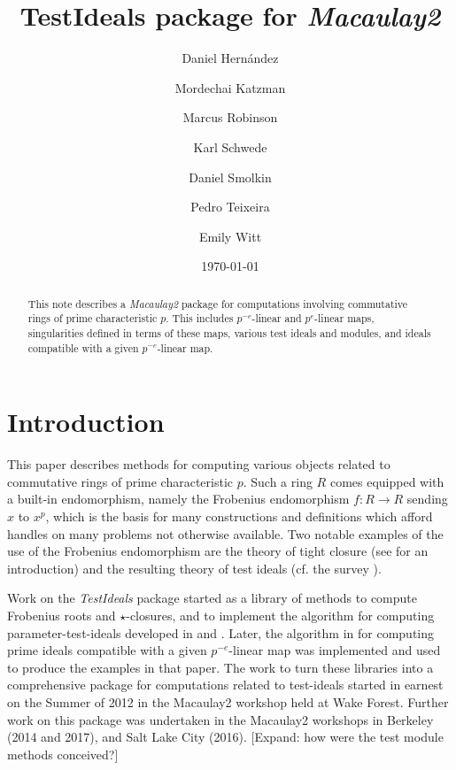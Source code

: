 \documentclass[11pt]{amsart}
\begin{document}
\title{{TestIdeals} package for \emph{Macaulay2}}
\author{Daniel Hern\'andez}
\author{Mordechai Katzman}
\author{Marcus Robinson}
\author{Karl Schwede}
\author{Daniel Smolkin}
\author{Pedro Teixeira}
\author{Emily Witt}
\date{\today}
\address{Department of Mathematics, University of Utah, 155 S 1400 E Room 233, Salt Lake City, UT, 84112}

\begin{abstract}
  This note describes a \emph{Macaulay2} package for computations involving commutative rings of prime characteristic $p$.   
  This includes $p^{-e}$-linear and $p^{e}$-linear  maps,
  singularities defined in terms of these maps,  various test ideals and modules, and ideals compatible with a given $p^{-e}$-linear map.
\end{abstract}




\maketitle

\section{Introduction}

This paper describes methods for computing various objects related to commutative rings of prime characteristic $p$.
Such a ring $R$ comes equipped with a built-in endomorphism, namely the Frobenius endomorphism $f:R \rightarrow R$ sending $x$ to $x^p$, which is the basis for many constructions and definitions
which afford handles on many problems not otherwise available. Two notable examples of the use of the Frobenius endomorphism are the theory of tight closure 
(see \cite{HochsterHunekeTC1} for an introduction)
and the resulting theory of test ideals
(cf. the survey \cite{SchwedeTuckerTestIdealSurvey}).

Work on the \emph{TestIdeals} package started as a library of methods to compute  Frobenius roots  and $\star$-closures, and to implement the algorithm for computing parameter-test-ideals
developed in \cite{KatzmanParameterTestIdealOfCMRings} and \cite{KatzmanFrobeniusMapsOnInjectiveHulls}.
Later, the algorithm in  \cite{KatzmanSchwedeAlgorithm} for computing prime ideals compatible with a given $p^{-e}$-linear map was implemented and 
used to produce the examples in that paper. The work to turn these libraries into a comprehensive package for computations related to test-ideals
started in earnest on the Summer of 2012 in the Macaulay2 workshop held at Wake Forest. Further work on this package was undertaken in the Macaulay2 workshops in 
Berkeley (2014 and 2017), and Salt Lake City (2016). 
{\hfill\large\color{red} [Expand: how were the test module methods conceived?]}\\
\end{document}
